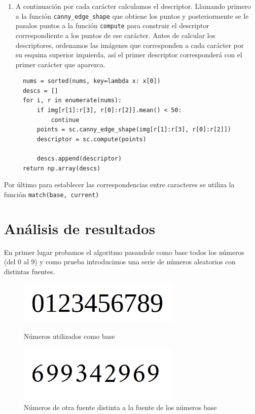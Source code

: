 \documentclass[size=a4, parskip=half, titlepage=false, toc=flat, toc=bib, 12pt]{scrartcl}
\begin{document}
\begin{enumerate}
\item A continuación por cada carácter calculamos el descriptor. Llamando primero a la función \verb|canny_edge_shape| que obtiene los puntos y posteriormente se le pasalos puntos a la función \verb|compute| para construir el descriptor correspondiente a los puntos de ese carácter. Antes de calcular los descriptores, ordenamos las imágenes que corresponden a cada carácter por su esquina superior izquierda, así el primer descriptor corresponderá con el primer carácter que aparezca.

\begin{verbatim}
  nums = sorted(nums, key=lambda x: x[0])
  descs = []
  for i, r in enumerate(nums):
      if img[r[1]:r[3], r[0]:r[2]].mean() < 50:
          continue
      points = sc.canny_edge_shape(img[r[1]:r[3], r[0]:r[2]])
      descriptor = sc.compute(points)

      descs.append(descriptor)
  return np.array(descs)
\end{verbatim}

\end{enumerate}
Por último para establecer las correspondencias entre caracteres se utiliza la función \verb|match(base, current)|

\newpage

\section{Análisis de resultados}
En primer lugar probamos el algoritmo pasandole como base todos los números (del 0 al 9) y como prueba introducimos una serie de números aleatorios con distintas fuentes.

\begin{figure}[H]
\centering
\includegraphics[width=8cm]{./img/base}
\caption{Números utilizados como base}
\includegraphics[width=8cm]{./img/telefono}
\caption{Números de otra fuente distinta a la fuente de los números base}
\end{figure}
\end{document}
